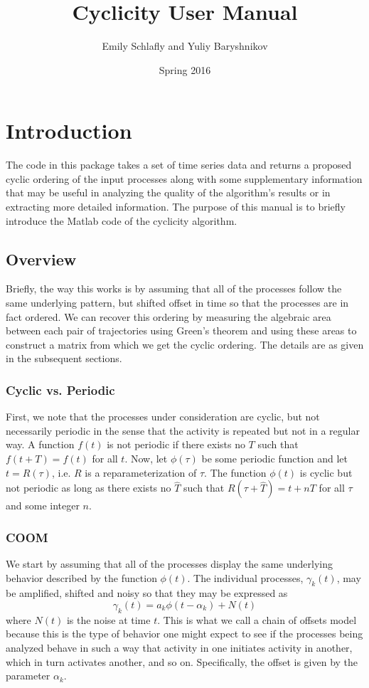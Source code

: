 \documentclass[11pt]{article}
\title{Cyclicity User Manual}
\author{Emily Schlafly and Yuliy Baryshnikov}
\date{Spring 2016}
\begin{document}
\maketitle

\tableofcontents

\section{Introduction}
The code in this package takes a set of time series data and returns a proposed cyclic ordering of the input processes along with some supplementary information that may be useful in analyzing the quality of the algorithm's results or in extracting more detailed information. The purpose of this manual is to briefly introduce the Matlab code of the cyclicity algorithm.
\subsection{Overview}
Briefly, the way this works is by assuming that all of the processes follow the same underlying pattern, but shifted offset in time so that the processes are in fact ordered. We can recover this ordering by measuring the algebraic area between each pair of trajectories using Green's theorem and using these areas to construct a matrix from which we get the cyclic ordering. The details are as given in the subsequent sections.
\subsubsection{Cyclic vs. Periodic}
First, we note that the processes under consideration are cyclic, but not necessarily periodic in the sense that the activity is repeated but not in a regular way. A function $f(t)$ is not periodic if there exists no $T$ such that $f(t+T) = f(t)$ for all $t$. Now, let $\phi(\tau)$ be some periodic function and let $t = R(\tau)$, i.e. $R$ is a reparameterization of $\tau$. The function $\phi(t)$ is cyclic but not periodic as long as there exists no $\hat T$ such that $R(\tau + \hat T) = t + nT$ for all $\tau$ and some integer $n$. 
\subsubsection{COOM}
We start by assuming that all of the processes display the same underlying behavior described by the function $\phi(t)$. The individual processes, $\gamma_k(t)$, may be amplified, shifted and noisy so that they may be expressed as
$$\gamma_k(t) = a_k\phi(t - \alpha_k) + N(t)$$
where $N(t)$ is the noise at time $t$. This is what we call a chain of offsets model because this is the type of behavior one might expect to see if the processes being analyzed behave in such a way that activity in one initiates activity in another, which in turn activates another, and so on. Specifically, the offset is given by the parameter $\alpha_k$.
\end{document}

